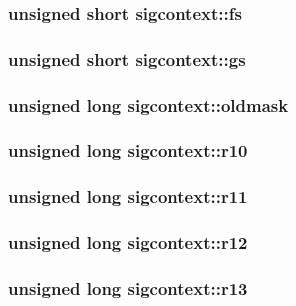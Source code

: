 \subsubsection[{fs}]{\setlength{\rightskip}{0pt plus 5cm}unsigned short {\bf sigcontext::fs}}\label{structsigcontext_a552013f323e462837078d420ef5d186a}
\subsubsection[{gs}]{\setlength{\rightskip}{0pt plus 5cm}unsigned short {\bf sigcontext::gs}}\label{structsigcontext_a33a2fa5457b632dbf03fb1f8503467e8}
\subsubsection[{oldmask}]{\setlength{\rightskip}{0pt plus 5cm}unsigned long {\bf sigcontext::oldmask}}\label{structsigcontext_adfe9d1041a802bd6627f2664c9d0a221}
\subsubsection[{r10}]{\setlength{\rightskip}{0pt plus 5cm}unsigned long {\bf sigcontext::r10}}\label{structsigcontext_a6a3b218055232da1b51c27772b160cd5}
\subsubsection[{r11}]{\setlength{\rightskip}{0pt plus 5cm}unsigned long {\bf sigcontext::r11}}\label{structsigcontext_a5c730ab27fd21bb6f49da4e90f4d2990}
\subsubsection[{r12}]{\setlength{\rightskip}{0pt plus 5cm}unsigned long {\bf sigcontext::r12}}\label{structsigcontext_a71f90d32dbf75cd55f943b450cf6fa96}
\subsubsection[{r13}]{\setlength{\rightskip}{0pt plus 5cm}unsigned long {\bf sigcontext::r13}}\label{structsigcontext_a72901b1c3adf2475b380470d5a9ea75d}
